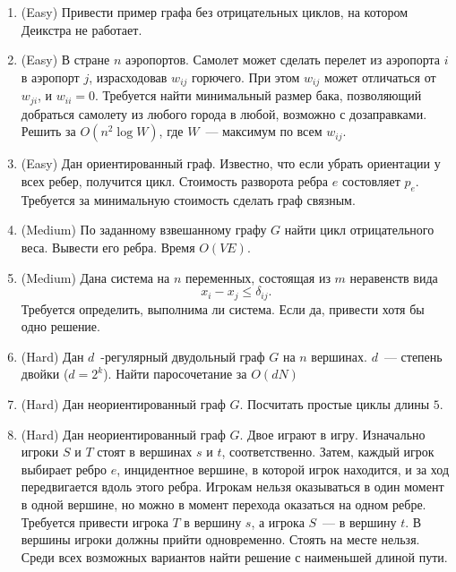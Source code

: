 \section{}

\begin{enumerate}

	\item (Easy) Привести пример графа без отрицательных циклов, 
    на котором Деикстра не работает.
	
	\item (Easy) В стране $n$ аэропортов. Самолет может сделать перелет 
	  из аэропорта $i$ в аэропорт $j$, израсходовав $w_{ij}$ горючего.
	  При этом $w_{ij}$ может отличаться от $w_{ji}$, и $w_{ii} = 0$.
	  Требуется найти минимальный размер бака, позволяющий добраться
	  самолету из любого города в любой, возможно с дозаправками.
	  Решить за $O(n^2 \log W)$, где $W$~--- максимум по всем $w_{ij}$.

	\item (Easy) Дан ориентированный граф. Известно, что если убрать ориентации
	  у всех ребер, получится цикл. Стоимость разворота ребра $e$ состовляет
	  $p_e$. Требуется за минимальную стоимость сделать граф связным.

	\item (Medium) По заданному взвешанному графу $G$ найти цикл отрицательного
	  веса. Вывести его ребра. Время $O(VE)$.

	\item (Medium) Дана система на $n$ переменных, состоящая из $m$ неравенств
	  вида
	  $$
	  	x_i - x_j \leq \delta_{ij}.
	  $$
	  Требуется определить, выполнима ли система. Если да, привести хотя
	  бы одно решение.

    \item (Hard) Дан $d$~-регулярный двудольный граф $G$ на $n$ вершинах. 
	  $d$~--- степень двойки ($d = 2^k$). Найти паросочетание 
	  за $O(dN)$
	 
    \item (Hard) Дан неориентированный граф $G$. Посчитать
	  простые циклы длины $5$.

	\item (Hard) Дан неориентированный граф $G$. Двое играют
	  в игру. Изначально игроки $S$ и $T$ стоят в вершинах $s$ и $t$, соответственно. 
	  Затем, каждый игрок выбирает ребро $e$, инцидентное вершине, в которой
	  игрок находится, и за ход передвигается вдоль этого ребра.
	  Игрокам нельзя оказываться в один момент в одной вершине, но
	  можно в момент перехода оказаться на одном ребре. Требуется
	  привести игрока $T$ в вершину $s$, а игрока $S$~--- в вершину
	  $t$. В вершины игроки должны прийти одновременно. Стоять на месте
	  нельзя. Среди всех возможных вариантов найти решение с наименьшей
	  длиной пути.
	

\end{enumerate}
